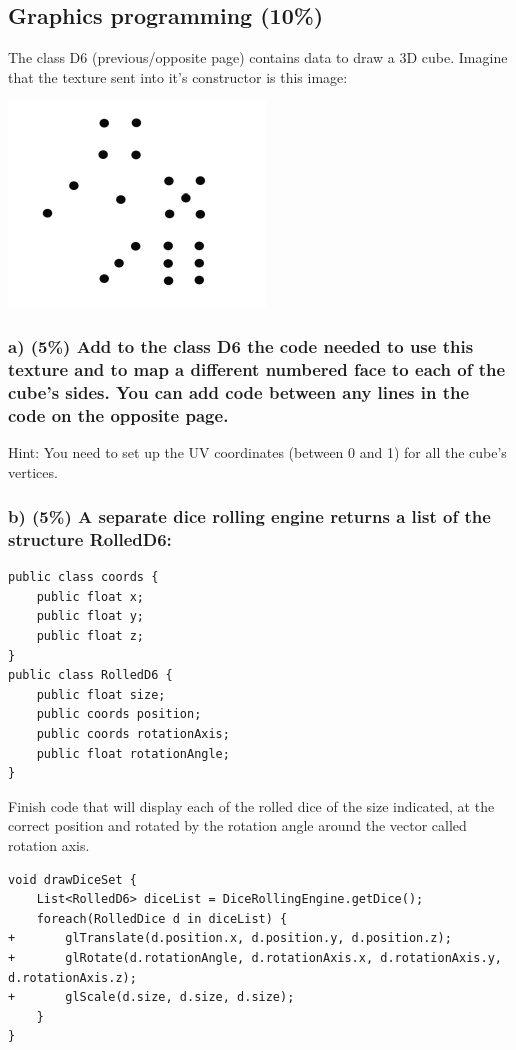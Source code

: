 \subsection{Graphics programming (10\%)}
The class D6 (previous/opposite page) contains data to draw a 3D cube.  Imagine that the texture sent into it's constructor is this image:

\includegraphics{sections/tasks/res/tgra-2013-07-dice-texture.png}

\subsubsection{a) (5\%) Add to the class D6 the code needed to use this texture and to map a different numbered face to each of the cube's sides. You can add code between any lines in the code on the opposite page.}
Hint: You need to set up the UV coordinates (between 0 and 1) for all the cube's vertices.

\subsubsection{b) (5\%) A separate dice rolling engine returns a list of the structure RolledD6:}

\small
\begin{verbatim}
public class coords {
    public float x;
    public float y;
    public float z;
}
public class RolledD6 {
    public float size;
    public coords position;
    public coords rotationAxis;
    public float rotationAngle;
}
\end{verbatim}

Finish code that will display each of the rolled dice of the size indicated, at the correct position and rotated by the rotation angle around the vector called rotation axis.

\begin{verbatim}
void drawDiceSet {
    List<RolledD6> diceList = DiceRollingEngine.getDice();
    foreach(RolledDice d in diceList) {
+       glTranslate(d.position.x, d.position.y, d.position.z);
+       glRotate(d.rotationAngle, d.rotationAxis.x, d.rotationAxis.y, d.rotationAxis.z);
+       glScale(d.size, d.size, d.size);
    }
}
\end{verbatim}
\normalsize
\newpage

